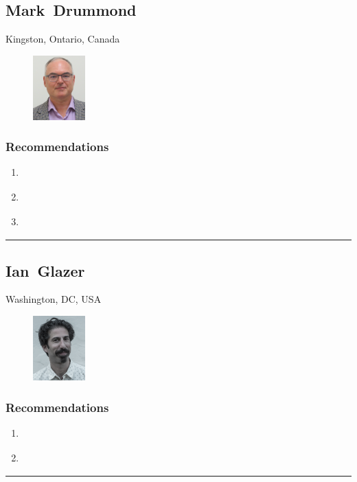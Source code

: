 \subsection{Mark~Drummond} \textsf{Kingston, Ontario, Canada} \par \setlength{\columnsep}{0pt} \begin{figure} \centering \includegraphics[width=0.18\textwidth]{bios/mdrummond.jpg} \end{figure}  \subsubsection{Recommendations}\begin{enumerate}
\item \cite{Bertocci2019a}
\item \cite{Bouma2020a}
\item \cite{Steadman2019a}
\end{enumerate}\noindent\rule{\textwidth}{0.2pt}

\subsection{Ian~Glazer} \textsf{Washington, DC, USA} \par \setlength{\columnsep}{0pt} \begin{figure} \centering \includegraphics[width=0.18\textwidth]{bios/iglazer.jpg} \end{figure}  \subsubsection{Recommendations}\begin{enumerate}
\item \cite{Clippinger2007}
\item \cite{Richer2017}
\end{enumerate}\noindent\rule{\textwidth}{0.2pt}

